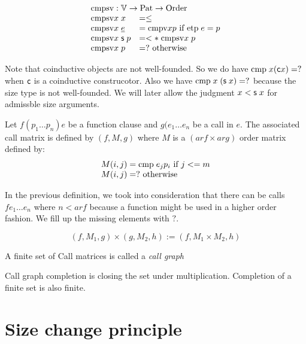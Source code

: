 \[
\begin{array}[t]{ll}
\multicolumn{2}{l}{\cmpsv : \cV \ra \Pat \ra \order}\\ 
\cmpsv x \; x & = \leq \\
\cmpsv x \; \inacc{e} & = \cmpv x p \mbox{ if } \etp e = p \\
\cmpsv x \; \s p & = < * \; \cmpsv x \; p \\
\cmpsv x \; p & = ? \mbox{ otherwise}
\end{array}
\]

Note that coinductive objects are not well-founded. So we do have $\mathrm{cmp}\; x (\mathsf{c} x) = ? $ when $\mathsf{c}$ is a coinductive construcotor.
Also we have $\mathrm{cmp}\; x \; (\mathsf{s}\; x) = ? $ because the size type is not well-founded.
We will later allow the judgment $x < \mathsf{s}\; x$ for admissble size arguments.


\begin{definition}
Let $f (p_1 \ldots p_n) e$ be a function clause and $g (e_1 \ldots e_n$ be a call in $e$.
The associated call matrix   is defined by $(f,M,g)$ where $M$ is a $(ar f \times ar g)$ order matrix defined by:
\[ 
\begin{array}[t]{l}
M(i,j) = \mathrm{cmp}\; e_j p_i \mbox{ if } j <= m \\
M(i,j) = ? \mbox{ otherwise} 
\end{array}
\]
\end{definition}
In the previous definition, we took into consideration that there can be calls $f e_1 \ldots e_n$ where $n < ar f$ because a function might be used in a higher order fashion. We fill up the missing elements with $?$. 

\begin{definition}
\[(f,M_1,g) \times (g,M_2,h) := (f,M_1 \times M_2,h)\]
\end{definition}

\begin{definition}
A finite set of Call matrices is called a \emph{call graph}
\end{definition}

\begin{definition}
Call graph completion is closing the set under multiplication.
Completion of a finite set is also finite. 
\end{definition}

\section{Size change principle}

